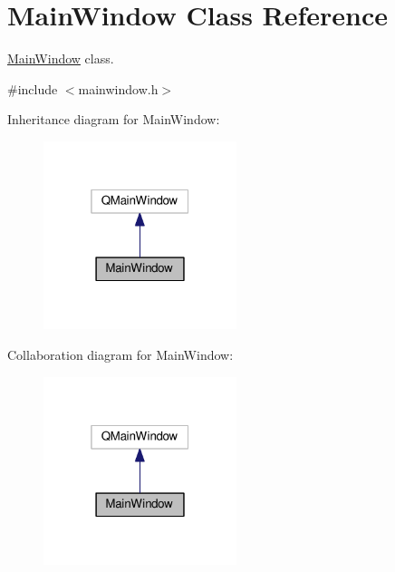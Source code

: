 \hypertarget{classMainWindow}{}\section{Main\+Window Class Reference}
\label{classMainWindow}


\hyperlink{classMainWindow}{Main\+Window} class.  




{\ttfamily \#include $<$mainwindow.\+h$>$}



Inheritance diagram for Main\+Window\+:\nopagebreak
\begin{figure}[H]
\begin{center}
\leavevmode
\includegraphics[width=160pt]{classMainWindow__inherit__graph}
\end{center}
\end{figure}


Collaboration diagram for Main\+Window\+:\nopagebreak
\begin{figure}[H]
\begin{center}
\leavevmode
\includegraphics[width=160pt]{classMainWindow__coll__graph}
\end{center}
\end{figure}
